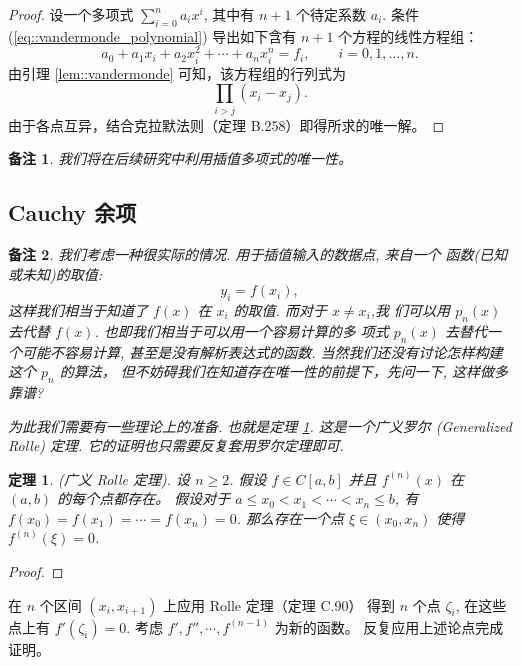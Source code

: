 \documentclass[a4paper]{ctexart}
\newtheorem{theorem}{定理}
\newtheorem{remark}{备注}
\numberwithin{theorem}{section}
\numberwithin{equation}{section}
\numberwithin{figure}{section}
\numberwithin{remark}{section}
\begin{document}
\begin{proof}
设一个多项式 $\sum_{i=0}^{n} a_i x^{i}$, 其中有 $n+1$ 个待定系数 $a_i$. 条件 (\ref{eq::vandermonde_polynomial}) 导出如下含有 $n+1$ 个方程的线性方程组：
\begin{equation*}
a_0 + a_1 x_i + a_2 x_i^{2} + \cdots + a_n x_i^{n} = f_i,\qquad i=0,1,\ldots,n.
\end{equation*}
由引理 \ref{lem::vandermonde} 可知，该方程组的行列式为
\begin{equation*}
\prod_{i>j}(x_i-x_j).
\end{equation*}
由于各点互异，结合克拉默法则（定理 B.258）即得所求的唯一解。
\end{proof}

\begin{remark}
我们将在后续研究中利用插值多项式的唯一性。    
\end{remark}

\subsection{Cauchy 余项}
\begin{remark}
我们考虑一种很实际的情况. 用于插值输入的数据点, 来自一个
函数(已知或未知)的取值:
$$
y_i = f(x_i),
$$
这样我们相当于知道了 $f(x)$ 在 $x_i$ 的取值. 而对于 $x \neq x_i$,我
们可以用 $p_n(x)$ 去代替 $f(x)$. 也即我们相当于可以用一个容易计算的多
项式 $p_n(x)$ 去替代一个可能不容易计算, 甚至是没有解析表达式的函数. 
当然我们还没有讨论怎样构建这个 $p_n$ 的算法，
但不妨碍我们在知道存在唯一性的前提下，先问一下, 这样做多靠谱?    

为此我们需要有一些理论上的准备. 也就是定理 \ref{thm::generalized_rolle}. 
这是一个广义罗尔
(Generalized Rolle) 定理. 它的证明也只需要反复套用罗尔定理即可.
\end{remark} 

\begin{theorem}
    \label{thm::generalized_rolle}
(广义 Rolle 定理). 设 $n \geq 2$. 
假设 $f \in C [a, b]$ 并且 $f^{(n)} (x)$ 在 $(a, b)$ 的每个点都存在。
假设对于 $a \leq x_0 < x_1 < \cdots < x_n \leq b$, 
有 $f (x_0) = f (x_1 ) = \cdots = f (x_n ) = 0$.
那么存在一个点 $\xi \in (x_0, x_n )$ 使得 $f^{(n)} (\xi) = 0$.    
\end{theorem}

\begin{proof}

\end{proof}
在 $n$ 个区间 $(x_i , x_{i+1} )$ 上应用 Rolle 定理（定理 C.90）
得到 $n$ 个点 $\zeta_i$, 在这些点上有 $f' (\zeta_i ) = 0$. 
考虑 $f' , f'' , \cdots , f^{(n-1)}$ 为新的函数。
反复应用上述论点完成证明。
\end{document}
